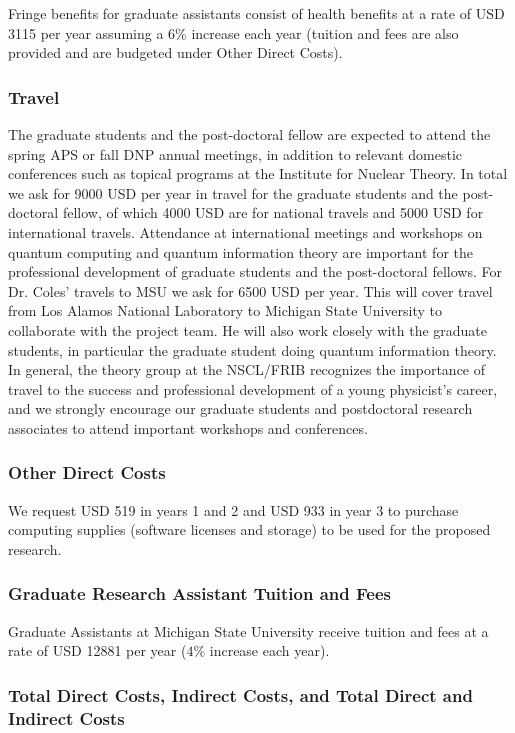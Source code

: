 \documentclass[10pt]{article}
\begin{document}
Fringe benefits for graduate assistants consist of health benefits at a rate of USD 3115 per year assuming a $6\%$ increase each year (tuition and fees are also provided and are budgeted under Other Direct Costs).

\subsubsection{Travel}
The graduate students and the post-doctoral fellow are expected to attend the spring APS or fall DNP annual meetings, in addition to relevant domestic conferences such as topical programs at the Institute for Nuclear Theory. In total we ask for 9000 USD per year in travel for the graduate students and the post-doctoral fellow, of which 4000 USD are for national travels and 5000 USD for international travels. Attendance at international meetings and workshops on quantum computing and quantum information theory are important for the professional development of graduate students and the post-doctoral fellows. 
For Dr. Coles’ travels to MSU we ask for 6500 USD per year. This will cover travel from Los Alamos National Laboratory to Michigan State University to collaborate with the project team. He will also work closely with the graduate students, in particular the graduate student doing quantum information theory. In general, the theory group at the NSCL/FRIB recognizes the importance of travel to the success and professional development of a young physicist's career, and we strongly encourage our graduate students and postdoctoral research associates to attend important workshops and conferences.  


\subsubsection{Other Direct Costs}


We request USD 519 in years 1 and 2 and USD 933 in year 3 to purchase computing supplies (software licenses and storage) to be used for the proposed research.

\subsubsection{Graduate Research Assistant Tuition and Fees}

Graduate Assistants at Michigan State University receive tuition and fees at a rate of USD 12881 per year ($4\%$ increase each year).

\subsubsection{Total Direct Costs, Indirect Costs, and Total Direct and Indirect Costs}
\end{document}
